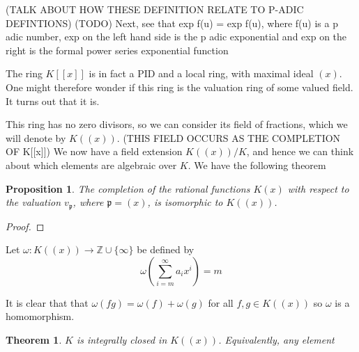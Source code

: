 \documentclass{article}
\newtheorem{theorem}{Theorem}[section]
\newtheorem{proposition}{Proposition}[section]
\newcommand{\mfrak}[1]{\mathfrak{#1}}
\newcommand{\mbb}[1]{\mathbb{#1}}
\begin{document}
(TALK ABOUT HOW THESE DEFINITION RELATE TO P-ADIC DEFINTIONS)
(TODO)
Next, see that exp f(u) = exp f(u), where f(u) is a p adic number, exp on the left hand side is the p adic exponential and exp on the right is the formal power series exponential function 



The ring $K[[x]]$ is in fact a PID and a local ring, with maximal ideal $(x)$. One might therefore wonder if this ring is the valuation ring of some valued field. It turns out that it is. 

This ring has no zero divisors, so we can consider its field of fractions, which we will denote by $K((x))$. (THIS FIELD OCCURS AS THE COMPLETION OF K[[x]]) We now have a field extension $K((x)) / K$, and hence we can think about which elements are algebraic over $K$. We have the following theorem


\begin{proposition}
    The completion of the rational functions $K(x)$ with respect to the valuation $v_\mfrak{p}$, where $\mfrak p = (x)$, is isomorphic to $K((x))$.  
\end{proposition}

\begin{proof}

\end{proof}


Let $\omega : K((x)) \to \mbb Z \cup \{\infty\} $ be defined by
$$\omega(\sum_{i = m}^\infty a_i x^i)  = m$$

It is clear that that $\omega(f g) = \omega(f) + \omega(g)$ for all $f,g \in K((x))$ so $\omega$ is a homomorphism.

\begin{theorem}
    $K$ is integrally closed in $K((x))$. Equivalently, any element 
\end{theorem}
\end{document}
